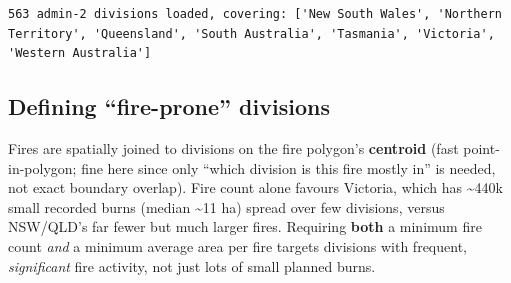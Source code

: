 \documentclass[
  letterpaper,
  DIV=11,
  numbers=noendperiod]{scrartcl}
\begin{document}
\begin{verbatim}
563 admin-2 divisions loaded, covering: ['New South Wales', 'Northern Territory', 'Queensland', 'South Australia', 'Tasmania', 'Victoria', 'Western Australia']
\end{verbatim}

\subsection{Defining ``fire-prone''
divisions}\label{defining-fire-prone-divisions}

Fires are spatially joined to divisions on the fire polygon's
\textbf{centroid} (fast point-in-polygon; fine here since only ``which
division is this fire mostly in'' is needed, not exact boundary
overlap). Fire count alone favours Victoria, which has
\textasciitilde440k small recorded burns (median \textasciitilde11 ha)
spread over few divisions, versus NSW/QLD's far fewer but much larger
fires. Requiring \textbf{both} a minimum fire count \emph{and} a minimum
average area per fire targets divisions with frequent,
\emph{significant} fire activity, not just lots of small planned burns.
\end{document}
